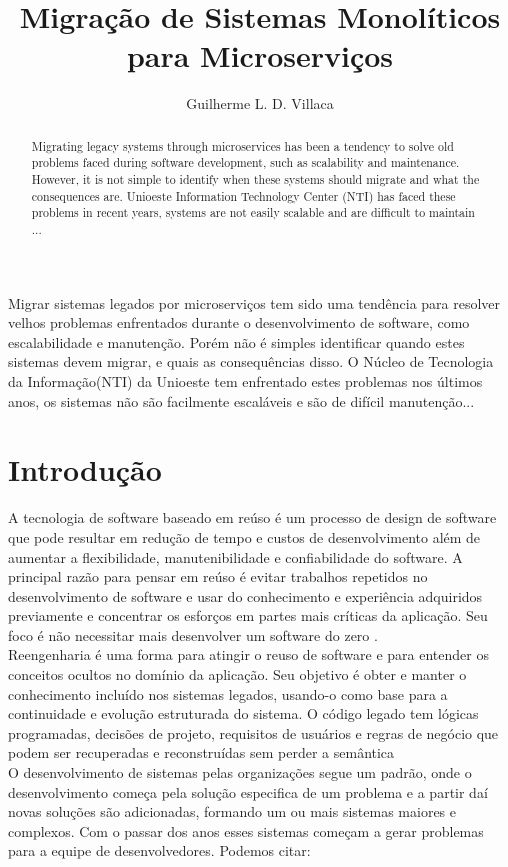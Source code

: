 \documentclass[12pt]{article}
\title{Migração de Sistemas Monolíticos para Microserviços}
\author{Guilherme L. D. Villaca\inst{1}}
\begin{document}
 

\maketitle

\begin{abstract}
Migrating legacy systems through microservices has been a tendency to solve old problems faced during software development, such as scalability and maintenance. However, it is not simple to identify when these systems should migrate and what the consequences are. Unioeste Information Technology Center (NTI) has faced these problems in recent years, systems are not easily scalable and are difficult to maintain ...
\end{abstract}
     
\begin{resumo} 
Migrar sistemas legados por microserviços tem sido uma tendência para resolver velhos problemas enfrentados durante o desenvolvimento de software, como escalabilidade e manutenção. Porém não é simples identificar quando estes sistemas devem migrar, e quais as consequências disso. O Núcleo de Tecnologia da Informação(NTI) da Unioeste tem enfrentado estes problemas nos últimos anos, os sistemas não são facilmente escaláveis e são de difícil manutenção...
\end{resumo}


\section{Introdução}


A tecnologia de software baseado em reúso é um processo de design de software que pode resultar em redução de tempo e custos de desenvolvimento além de aumentar a flexibilidade, manutenibilidade e confiabilidade do software. A principal razão para pensar em reúso é evitar trabalhos repetidos no desenvolvimento de software e usar do conhecimento e experiência adquiridos previamente e concentrar os esforços em partes mais críticas da aplicação. Seu foco é não necessitar mais desenvolver um software do zero \cite{Yang}.  
\\
Reengenharia é uma forma para atingir o reuso de software e para entender os conceitos ocultos no domínio da aplicação. Seu objetivo é obter e manter o conhecimento incluído nos sistemas legados, usando-o como base para a continuidade e evolução estruturada do sistema. O código legado tem lógicas programadas, decisões de projeto, requisitos de usuários e regras de negócio que podem ser recuperadas e reconstruídas sem perder a semântica \cite{Garcia2004a}
\\
O desenvolvimento de sistemas pelas organizações segue um padrão, onde o desenvolvimento começa pela solução especifica de um problema e a partir daí novas soluções são adicionadas, formando um ou mais sistemas maiores e complexos. Com o passar dos anos esses sistemas começam a gerar problemas para a equipe de desenvolvedores. Podemos citar: 
\end{document}
